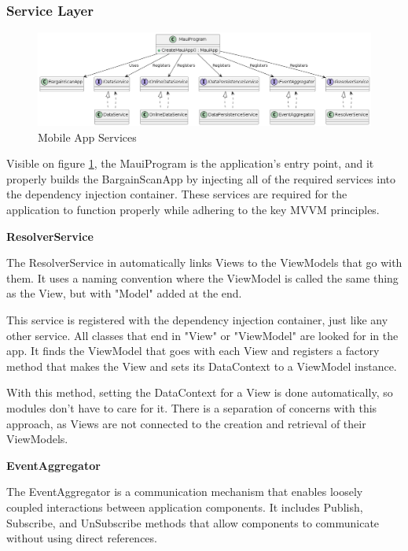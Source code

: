 \pagebreak

\subsubsection{Service Layer}

\begin{figure}[H]
	\centering
	\includegraphics[width=1\linewidth]{img/app_services.png}
	\caption{Mobile App Services}
	\label{fig:appservices}
\end{figure}

Visible on figure \ref{fig:appservices}, the MauiProgram is the application's entry point, and it properly builds the BargainScanApp by injecting all of the required services into the dependency injection container. These services are required for the application to function properly while adhering to the key MVVM principles.

\noindent\textbf{ResolverService}

The ResolverService in automatically links Views to the ViewModels that go with them. It uses a naming convention where the ViewModel is called the same thing as the View, but with "Model" added at the end.

This service is registered with the dependency injection container, just like any other service. All classes that end in "View" or "ViewModel" are looked for in the app. It finds the ViewModel that goes with each View and registers a factory method that makes the View and sets its DataContext to a ViewModel instance.

With this method, setting the DataContext for a View is done automatically, so modules don't have to care for it. There is a separation of concerns with this approach, as Views are not connected to the creation and retrieval of their ViewModels.

\noindent\textbf{EventAggregator}

The EventAggregator is a communication mechanism that enables loosely coupled interactions between application components. It includes Publish, Subscribe, and UnSubscribe methods that allow components to communicate without using direct references.

